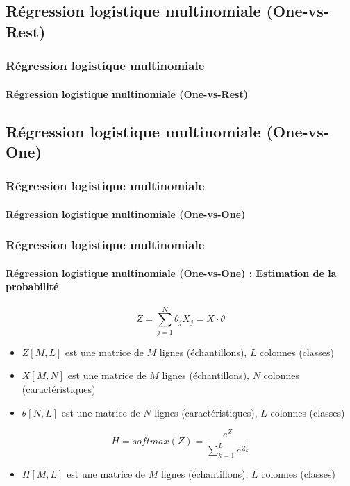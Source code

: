 \documentclass[xcolor=table]{beamer}
\begin{document}
\subsection{Régression logistique multinomiale (One-vs-Rest)}

\begin{frame}
	\frametitle{Régression logistique multinomiale}
	\framesubtitle{Régression logistique multinomiale (One-vs-Rest)}
	
	
\end{frame}

\subsection{Régression logistique multinomiale (One-vs-One)}

\begin{frame}
	\frametitle{Régression logistique multinomiale}
	\framesubtitle{Régression logistique multinomiale (One-vs-One)}
	
	
\end{frame}

\begin{frame}
	\frametitle{Régression logistique multinomiale}
	\framesubtitle{Régression logistique multinomiale (One-vs-One) : Estimation de la probabilité}
	
	\[Z = \sum_{j=1}^{N} \theta_j X_j = X \cdot \theta\]
	\begin{itemize}
		\item $Z[M, L]$ est une matrice de $M$ lignes (échantillons), $L$ colonnes (classes)
		\item $X[M, N]$ est une matrice de $M$ lignes (échantillons), $N$ colonnes (caractéristiques)
		\item $\theta[N, L]$ est une matrice de $N$ lignes (caractéristiques), $L$ colonnes (classes)
	\end{itemize}
	
	\[H = softmax(Z) = \frac{e^{Z}}{\sum_{k=1}^{L} e^{Z_k}}\]
	
	\begin{itemize}
		\item $H[M, L]$ est une matrice de $M$ lignes (échantillons), $L$ colonnes (classes)
	\end{itemize}
	
\end{frame}
\end{document}
